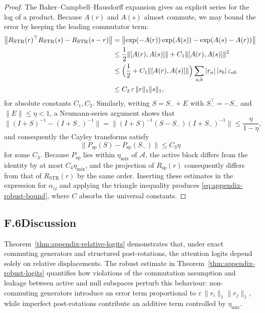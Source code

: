 \documentclass[11pt]{article}
\begin{document}
\begin{proof}
The Baker--Campbell--Hausdorff expansion gives an explicit series for the log of a product.  Because
$A(r)$ and $A(s)$ almost commute, we may bound the error by keeping the leading commutator term:
\begin{align}
  \bigl\|R_{\mathrm{STR}}(r)^\top R_{\mathrm{STR}}(s) - R_{\mathrm{STR}}(s-r)\bigr\|
  &= \bigl\|\exp(-A(r)) \exp(A(s)) - \exp(A(s)-A(r))\bigr\|\\
  &\le \frac{1}{2} \|[A(r),A(s)]\| + C_1 \|[A(r),A(s)]\|^2\\
  &\le \Bigl(\frac{1}{2} + C_1 \|[A(r),A(s)]\|\Bigr)
        \sum_{a,b} |r_a|\,|s_b|\,\varepsilon_{ab}\\
  &\le C_2\,\varepsilon\,\|r\|_1 \|s\|_1,
\end{align}
for absolute constants $C_1,C_2$.  Similarly, writing $S = S_- + E$ with $S_-^\top = -S_-$ and
$\|E\| \le \eta < 1$, a Neumann-series argument shows that
\begin{equation}
  \|(I+S)^{-1} - (I+S_-)^{-1}\|
  = \|(I+S)^{-1} (S - S_-) (I + S_-)^{-1}\|
  \le \frac{\eta}{1-\eta},
\end{equation}
and consequently the Cayley transforms satisfy
\begin{equation}
  \|P_{\mathrm{sp}}(S) - P_{\mathrm{sp}}(S_-)\| \le C_3 \eta
\end{equation}
for some $C_3$.  Because $P_{\mathrm{sp}}$ lies within $\eta_{\mathrm{mix}}$ of $\mathcal{A}$, the active block
differs from the identity by at most $C_4 \eta_{\mathrm{mix}}$, and the projection of
$R_{\mathrm{sp}}(r)$ consequently differs from that of $R_{\mathrm{STR}}(r)$ by the same order.  Inserting
these estimates in the expression for $\alpha_{ij}$ and applying the triangle inequality produces
\eqref{eq:appendix-robust-bound}, where $C$ absorbs the universal constants.
\end{proof}

\subsection*{F.6\quad Discussion}

Theorem~\ref{thm:appendix-relative-logits} demonstrates that, under exact commuting generators and
structured post-rotations, the attention logits depend solely on relative displacements.  The robust
estimate in Theorem~\ref{thm:appendix-robust-logits} quantifies how violations of the commutation
assumption and leakage between active and null subspaces perturb this behaviour: non-commuting
generators introduce an error term proportional to $\varepsilon\,\|r_i\|_1\|r_j\|_1$, while imperfect
post-rotations contribute an additive term controlled by $\eta_{\mathrm{mix}}$.
\end{document}
